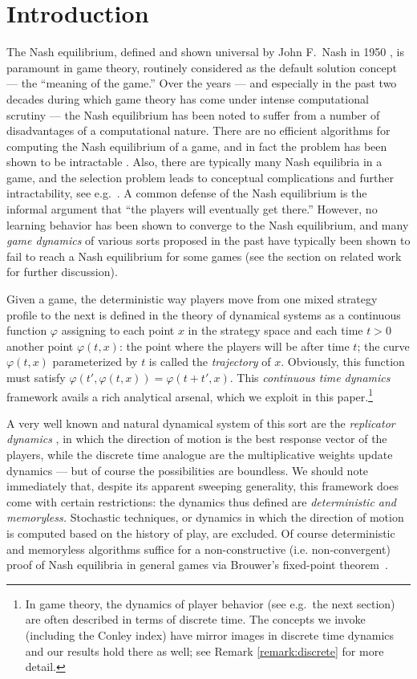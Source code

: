\documentclass[11pt]{article}
\begin{document}
\section{Introduction}
The Nash equilibrium, defined and shown universal by John F.~Nash in 1950 \citep{Nash1950}, is paramount in game theory, routinely considered as the default solution concept --- the ``meaning of the game.'' 
Over the years --- and especially in the past two decades during which game theory 
has come under intense computational scrutiny --- the Nash equilibrium has been noted to
suffer from a number of disadvantages of a computational nature.
There are no efficient algorithms for computing the Nash equilibrium of a game, 
and in fact the problem has been shown to be intractable \citep{DGP,CDT,EY}.
Also, there are typically many Nash equilibria in a game, and the selection problem
leads to conceptual complications and further intractability, see e.g.~\citep{GP}.
A common defense of the Nash equilibrium is the informal argument that ``the players will eventually get there.''
However, no learning behavior has been shown to converge to the Nash equilibrium, and
many {\em game dynamics} of various sorts proposed in the past have typically been shown to fail to reach a Nash equilibrium for some games (see the section on related work for further discussion).  

Given a game, the deterministic way players move from one mixed strategy profile to the next is defined in the theory of dynamical systems as a continuous function $\varphi$ assigning to  each point $x$ in the strategy space and each time $t>0$ another point $\varphi(t,x)$: the point where the players will be after time $t$; the curve $\varphi(t,x)$ parameterized by $t$ is called the {\em trajectory} of $x$. Obviously, this function must satisfy $\varphi(t',\varphi(t,x))=\varphi(t+t', x)$.  This {\em continuous time dynamics} framework avails a rich analytical arsenal, which we exploit in this paper.\footnote{  In game theory, the dynamics of player behavior (see e.g.~the next section) are often described in terms of discrete time. The concepts we invoke (including the Conley index) have mirror images in discrete time dynamics and our results hold there as well; see Remark \ref{remark:discrete} for more detail.}

A very well known and natural dynamical system of this sort are the {\em replicator dynamics} \citep{RD_first_paper}, in which the direction of motion is the best response vector of the players, while the discrete time analogue are the multiplicative weights update dynamics \citep{MWU_WMA_Littlestone,MWU_Arora} --- but of course the possibilities are boundless.  
We should note immediately that, despite its apparent sweeping generality, this framework does come with certain restrictions: the dynamics thus defined are {\em deterministic and memoryless.} Stochastic techniques, or dynamics in which the direction of motion is computed based on the history of play, are excluded. {\color{black} Of course deterministic and memoryless algorithms suffice for a non-constructive (i.e. non-convergent) proof  of Nash equilibria in general games via Brouwer's  fixed-point theorem~\citep{nash1951non}.}
\end{document}
